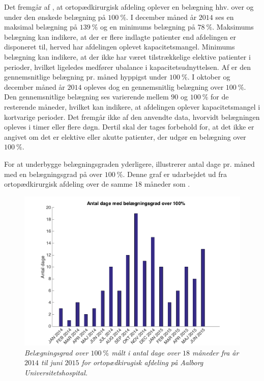 \noindent
Det fremgår af , at ortopædkirurgisk afdeling oplever en belægning hhv. over og under den ønskede belægning på $100~\%$. I december måned år $2014$ ses en maksimal belægning på $139~\%$ og en minimums belægning på $78~\%$. Maksimums belægning kan indikere, at der er flere indlagte patienter end afdelingen er disponeret til, herved har afdelingen oplevet kapacitetsmangel. Minimums belægning kan indikere, at der ikke har været tilstrækkelige elektive patienter i perioder, hvilket ligeledes medfører ubalance i kapacitetsudnyttelsen. Af  er den gennemsnitlige belægning pr. måned hyppigst under $100~\%$. I oktober og december måned år $2014$ opleves dog en gennemsnitlig belægning over $100~\%$. Den gennemsnitlige belægning ses varierende mellem $90$ og $100~\%$ for de resterende måneder, hvilket kan indikere, at afdelingen oplever kapacitetsmangel i kortvarige perioder.\cite{SDS2015} 
Det fremgår ikke af den anvendte data, hvorvidt belægningen opleves i timer eller flere døgn. Dertil skal der tages forbehold for, at det ikke er angivet om det er elektive eller akutte patienter, der udgør en belægning over $100~\%$.\cite{SDS2015} 

 
For at underbygge belægningsgraden yderligere, illustrerer  antal dage pr. måned med en belægningsgrad på over $100~\%$. Denne graf er udarbejdet ud fra ortopædkirurgisk afdeling over de samme 18 måneder som . \cite{SDS2015} 

\begin{figure}[H]
	\flushleft 
	\centering
	\includegraphics[scale=.4]{figures/antaldage.png}
	\flushleft
	\caption{\textit{Belægningsgrad over $100~\%$ målt i antal dage over $18$ måneder fra år $2014$ til juni $2015$ for ortopædkirugisk afdeling på Aalborg Universitetshospital.}\cite{SDS2015}}
	\label{antaldage}
\end{figure}

